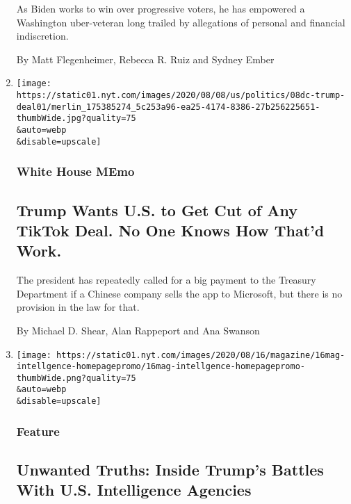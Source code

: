 \begin{enumerate}
  As Biden works to win over progressive voters, he has empowered a
  Washington uber-veteran long trailed by allegations of personal and
  financial indiscretion.

  By Matt Flegenheimer, Rebecca R. Ruiz and Sydney Ember
\item
  \href{/2020/08/08/us/politics/trump-tiktok-deal-treasury.html}{}

  \texttt{[image: https://static01.nyt.com/images/2020/08/08/us/politics/08dc-trump-deal01/merlin\_175385274\_5c253a96-ea25-4174-8386-27b256225651-thumbWide.jpg?quality=75\\\&auto=webp\\\&disable=upscale]}

  \hypertarget{white-house-memo}{%
  \subsubsection{White House MEmo}\label{white-house-memo}}

  \hypertarget{trump-wants-us-to-get-cut-of-any-tiktok-deal-no-one-knows-how-thatd-work}{%
  \subsection{Trump Wants U.S. to Get Cut of Any TikTok Deal. No One
  Knows How That'd
  Work.}\label{trump-wants-us-to-get-cut-of-any-tiktok-deal-no-one-knows-how-thatd-work}}

  The president has repeatedly called for a big payment to the Treasury
  Department if a Chinese company sells the app to Microsoft, but there
  is no provision in the law for that.

  By Michael D. Shear, Alan Rappeport and Ana Swanson
\item
  \href{/2020/08/08/magazine/us-russia-intelligence.html}{}

  \texttt{[image: https://static01.nyt.com/images/2020/08/16/magazine/16mag-intellgence-homepagepromo/16mag-intellgence-homepagepromo-thumbWide.png?quality=75\\\&auto=webp\\\&disable=upscale]}

  \hypertarget{feature}{%
  \subsubsection{Feature}\label{feature}}

  \hypertarget{unwanted-truths-inside-trumps-battles-with-us-intelligence-agencies}{%
  \subsection{Unwanted Truths: Inside Trump's Battles With U.S.
  Intelligence
  Agencies}\label{unwanted-truths-inside-trumps-battles-with-us-intelligence-agencies}}


\end{enumerate}
